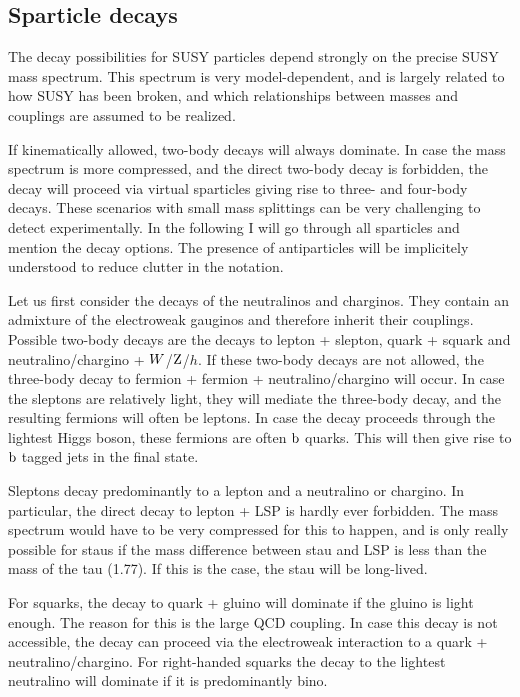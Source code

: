 \subsection{Sparticle decays}

The decay possibilities for SUSY particles depend strongly on the precise SUSY mass spectrum. 
This spectrum is very model-dependent, and is largely related to how SUSY has been broken, and
which relationships between masses and couplings are assumed to be realized. 

If kinematically allowed, two-body decays will always dominate. In case the mass spectrum is more
compressed, and the direct two-body decay is forbidden, the decay will proceed via virtual
sparticles giving rise to three- and four-body decays. These scenarios with small mass splittings
can be very challenging to detect experimentally. In the following I will go through all sparticles
and mention the decay options. The presence of antiparticles will be implicitely understood to
reduce clutter in the notation. 

Let us first consider the decays of the neutralinos and charginos. They contain an admixture of the
electroweak gauginos and therefore inherit their couplings. Possible two-body decays are the decays
to lepton + slepton, quark + squark and neutralino/chargino + $W$/$\mathrm{Z}$/$h$. If these two-body
decays are not allowed, the three-body decay to fermion + fermion + neutralino/chargino will
occur. In case the sleptons are relatively light, they will mediate the three-body decay, and the
resulting fermions will often be leptons. In case the decay proceeds through the lightest Higgs
boson, these fermions are often $\mathrm{b}$ quarks. This will then give rise to $\mathrm{b}$ tagged jets in
the final state. 

Sleptons decay predominantly to a lepton and a neutralino or chargino. 
In particular, the direct decay to lepton + LSP is hardly ever forbidden. 
The mass spectrum would have to be very compressed for this to happen, and is only really
possible for staus if the mass difference between stau and LSP is less than the mass
of the tau (1.77\GeV). If this is the case, the stau will be long-lived. 

For squarks, the decay to quark + gluino will dominate if the gluino is light enough. The reason
for this is the large QCD coupling. 
In case this decay is not accessible, the decay can proceed via the electroweak interaction to a
quark + neutralino/chargino. For right-handed squarks the decay to the lightest neutralino will
 dominate if it is predominantly bino. 

